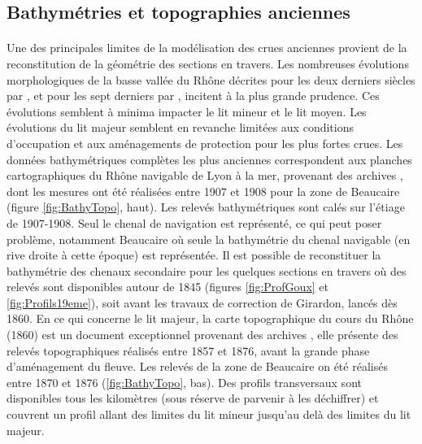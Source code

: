 \documentclass[11pt]{article}
\begin{document}
	\subsection{Bathymétries et topographies anciennes}
	
	\paragraph{} Une des principales limites de la modélisation des crues anciennes provient de la reconstitution de la géométrie des sections en travers. Les nombreuses évolutions morphologiques de la basse vallée du Rhône décrites pour les deux derniers siècles par \citet{raccasi_mutations_2008}, et pour les sept derniers	par \citet{pichard_sept_2014}, incitent à la plus grande prudence. Ces évolutions semblent à minima impacter le lit mineur et le lit moyen. Les évolutions du lit majeur semblent en revanche limitées aux conditions d'occupation et aux aménagements de protection pour les plus fortes crues. Les données bathymétriques complètes les plus anciennes correspondent aux planches cartographiques du Rhône navigable de Lyon à la mer, provenant des archives \citet{cnr_cartes_1908}, dont les mesures ont été réalisées entre 1907 et 1908 pour la zone de Beaucaire (figure \ref{fig:BathyTopo}, haut). Les relevés bathymétriques sont calés sur l'étiage de 1907-1908. Seul le chenal de navigation est représenté, ce qui peut poser problème, notamment Beaucaire où seule la bathymétrie du chenal navigable (en rive droite à cette époque) est représentée. Il est possible de reconstituer la bathymétrie des chenaux secondaire pour les quelques sections en travers où des relevés sont disponibles autour de 1845 (figures \ref{fig:ProfGoux} et \ref{fig:Profils19eme}), soit avant les travaux de correction de Girardon, lancés dès 1860. En ce qui concerne le lit majeur, la carte topographique du cours du Rhône (1860) est un document exceptionnel provenant des archives \cite{cnr_carte_1876}, elle présente des relevés topographiques réalisés entre 1857 et 1876, avant la grande phase d'aménagement du fleuve. Les relevés de la zone de Beaucaire on été réalisés entre 1870 et 1876 (\ref{fig:BathyTopo}, bas). Des profils transversaux sont disponibles tous les kilomètres (sous réserve de parvenir à les déchiffrer) et couvrent un profil allant des limites du lit mineur jusqu'au delà des limites du lit majeur.
		
\end{document}
